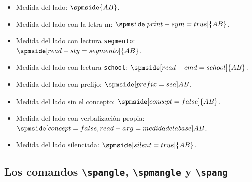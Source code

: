 \documentclass{article}
\begin{document}
\begin{itemize}
  \item Medida del lado: $\spmside{AB}$.
  \item Medida del lado con la letra m: $\spmside[print-sym=true]{AB}$.
  \item Medida del lado con lectura \texttt{segmento}: $\spmside[read-sty=segmento]{AB}$.
  \item Medida del lado con lectura \texttt{school}: $\spmside[read-cmd=school]{AB}$.
  \item Medida del lado con prefijo: $\spmside[prefix={sea}]{AB}$.
  \item Medida del lado sin el concepto: $\spmside[concept=false]{AB}$.
  \item Medida del lado con verbalización propia: $\spmside[concept=false,read-arg={medida de la base}]{AB}$.
  \item Medida del lado silenciada: $\spmside[silent=true]{AB}$.
\end{itemize}

\subsection*{Los comandos \texttt{\textbackslash spangle}, \texttt{\textbackslash spmangle} y \texttt{\textbackslash spang}}
\end{document}
